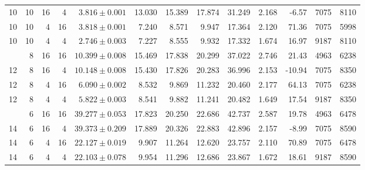 \begin{table}[t]
\begin{tabular}{@{}rrrrrrrrrrrrr@{}}
10 & 10 & 16 & 4 & $3.816\pm0.001$ & 13.030 & 15.389 & 17.874 & 31.249 & 2.168 & -6.57 & 7075 & 8110 \\
10 & 10 & 4 & 16 & $3.818\pm0.001$ & 7.240 & 8.571 & 9.947 & 17.364 & 2.120 & 71.36 & 7075 & 5998 \\
10 & 10 & 4 & 4 & $2.746\pm0.003$ & 7.227 & 8.555 & 9.932 & 17.332 & 1.674 & 16.97 & 9187 & 8110 \\
\addlinespace
12 & 8 & 16 & 16 & $10.399\pm0.008$ & 15.469 & 17.838 & 20.299 & 37.022 & 2.746 & 21.43 & 4963 & 6238 \\
12 & 8 & 16 & 4 & $10.148\pm0.008$ & 15.430 & 17.826 & 20.283 & 36.996 & 2.153 & -10.94 & 7075 & 8350 \\
12 & 8 & 4 & 16 & $6.090\pm0.002$ & 8.532 & 9.869 & 11.232 & 20.460 & 2.177 & 64.13 & 7075 & 6238 \\
12 & 8 & 4 & 4 & $5.822\pm0.003$ & 8.541 & 9.882 & 11.241 & 20.482 & 1.649 & 17.54 & 9187 & 8350 \\
\addlinespace
14 & 6 & 16 & 16 & $39.277\pm0.053$ & 17.823 & 20.250 & 22.686 & 42.737 & 2.587 & 19.78 & 4963 & 6478 \\
14 & 6 & 16 & 4 & $39.373\pm0.209$ & 17.889 & 20.326 & 22.883 & 42.896 & 2.157 & -8.99 & 7075 & 8590 \\
14 & 6 & 4 & 16 & $22.127\pm0.019$ & 9.907 & 11.264 & 12.620 & 23.757 & 2.110 & 70.89 & 7075 & 6478 \\
14 & 6 & 4 & 4 & $22.103\pm0.078$ & 9.954 & 11.296 & 12.686 & 23.867 & 1.672 & 18.61 & 9187 & 8590 \\
\bottomrule
\end{tabular}
\end{table}
